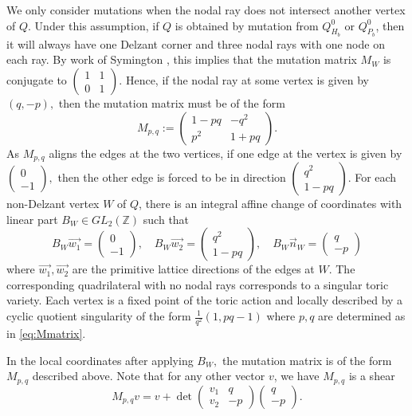 \documentclass[11pt, reqno]{amsart}
\theoremstyle{remark}
\numberwithin{equation}{subsection}
\numberwithin{figure}{section}
\theoremstyle{customremark}
\newcommand{\vn}{{\vec{n}}}
\newcommand{\ovr}{\overrightarrow}
\newcommand{\Z}{\mathbb{Z}}
\begin{document}
We only consider mutations when the nodal ray does not intersect another vertex of $Q.$ Under this assumption, if $Q$ is obtained by mutation from $Q_{H_b}^0$ or $Q_{P_b}^0$, then it will always have one Delzant corner and three nodal rays with one node on each ray. By work of Symington \cite{S}, this implies that the mutation matrix $M_W$ is conjugate to $\begin{pmatrix} 1 & 1 \\ 0 & 1 \end{pmatrix}.$ Hence, if the nodal ray at some vertex is given by $(q,-p),$ then the mutation matrix must be of the form
\[M_{p,q}:=\begin{pmatrix} 1-pq & -q^2 \\ p^2 & 1+pq \end{pmatrix} .\]
As $M_{p,q}$ aligns the edges at the two vertices, if one edge at the vertex is given by $\begin{pmatrix} 0 \\ -1 \end{pmatrix},$ then the other edge is forced to be in direction $\begin{pmatrix} q^2 \\ 1-pq \end{pmatrix}.$ For each non-Delzant vertex $W$ of $Q$, there is an integral affine change of coordinates with linear part $B_W\in GL_2(\Z)$ such that
\begin{equation} \label{eq:Mmatrix} B_W\ovr{w_1}=\begin{pmatrix} 0 \\ -1 \end{pmatrix}, \quad B_W\ovr{w_2}=\begin{pmatrix} q^2 \\ 1-pq \end{pmatrix},\quad  B_W\vn_W=\begin{pmatrix} q \\ -p \end{pmatrix} \end{equation}
where $\ovr{w_1},\ovr{w_2}$ are the primitive lattice directions of the edges at $W.$ The corresponding quadrilateral with no nodal rays corresponds to a singular toric variety. Each vertex is a fixed point of the toric action and locally described by a cyclic quotient singularity of the form $\tfrac{1}{q^2}(1,pq-1)$ where $p,q$ are determined as in \eqref{eq:Mmatrix}. 

In the local coordinates after applying $B_W,$ the mutation matrix is of the form $M_{p,q}$ described above. Note that for any other vector $v$, we have $M_{p,q}$ is a shear
 \[ M_{p,q}v=v+\det\begin{pmatrix} v_1 & q \\ v_2 & -p \end{pmatrix}\begin{pmatrix} q \\ -p \end{pmatrix}.\]
\end{document}
